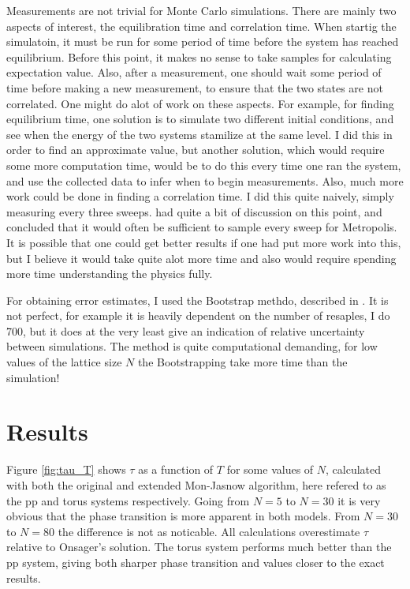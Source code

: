 \documentclass[12pt, a4paper]{article}
\begin{document}
Measurements are not trivial for Monte Carlo simulations.
There are mainly two aspects of interest, the equilibration time and correlation time.
When startig the simulatoin, it must be run for some period of time before the system has reached equilibrium.
Before this point, it makes no sense to take samples for calculating expectation value.
Also, after a measurement, one should wait some period of time before making a new measurement, to ensure that the two states are not correlated.
One might do alot of work on these aspects.
For example, for finding equilibrium time, one solution is to simulate two different initial conditions, and see when the energy of the two systems stamilize at the same level.
I did this in order to find an approximate value, but another solution, which would require some more computation time, would be to do this every time one ran the system, and use the collected data to infer when to begin measurements.
Also, much more work could be done in finding a correlation time.
I did this quite naively, simply measuring every three sweeps.
\cite{niels} had quite a bit of discussion on this point, and concluded that it would often be sufficient to sample every sweep for Metropolis.
It is possible that one could get better results if one had put more work into this, but I believe it would take quite alot more time and also would require spending more time understanding the physics fully.

For obtaining error estimates, I used the Bootstrap methdo, described in \cite{niels}.
It is not perfect, for example it is heavily dependent on the number of resaples, I do 700, but it does at the very least give an indication of relative uncertainty between simulations.
The method is quite computational demanding, for low values of the lattice size $N$ the Bootstrapping take more time than the simulation!

\section{Results}
Figure \ref{fig:tau_T} shows $\tau$ as a function of $T$ for some values of $N$, calculated with both the original and extended Mon-Jasnow algorithm, here refered to as the pp and torus systems respectively.
Going from $N=5$ to $N=30$ it is very obvious that the phase transition is more apparent in both models.
From $N=30$ to $N=80$ the difference is not as noticable.
All calculations overestimate $\tau$ relative to Onsager's solution.
The torus system performs much better than the pp system, giving both sharper phase transition and values closer to the exact results.
\end{document}
